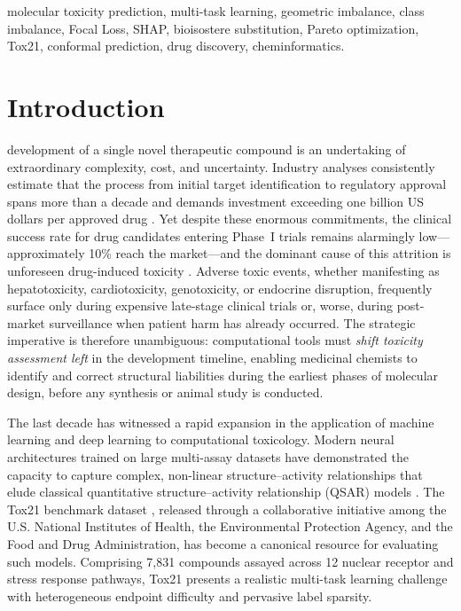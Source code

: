 \documentclass[lettersize,journal]{IEEEtran}
\begin{document}
\begin{IEEEkeywords}
molecular toxicity prediction, multi-task learning, geometric imbalance,
class imbalance, Focal Loss, SHAP, bioisostere substitution, Pareto
optimization, Tox21, conformal prediction, drug discovery, cheminformatics.
\end{IEEEkeywords}

\section{Introduction}
 development of a single novel therapeutic compound is an
undertaking of extraordinary complexity, cost, and uncertainty.
Industry analyses consistently estimate that the process from initial target
identification to regulatory approval spans more than a decade and demands
investment exceeding one billion US dollars per approved drug \cite{kola2004}.
Yet despite these enormous commitments, the clinical success rate for drug
candidates entering Phase~I trials remains alarmingly low---approximately 10\%
reach the market---and the dominant cause of this attrition is unforeseen
drug-induced toxicity \cite{sun2022}.
Adverse toxic events, whether manifesting as hepatotoxicity, cardiotoxicity,
genotoxicity, or endocrine disruption, frequently surface only during expensive
late-stage clinical trials or, worse, during post-market surveillance when
patient harm has already occurred.
The strategic imperative is therefore unambiguous: computational tools must
\textit{shift toxicity assessment left} in the development timeline, enabling
medicinal chemists to identify and correct structural liabilities during the
earliest phases of molecular design, before any synthesis or animal study is
conducted.

The last decade has witnessed a rapid expansion in the application of machine
learning and deep learning to computational toxicology.
Modern neural architectures trained on large multi-assay datasets have
demonstrated the capacity to capture complex, non-linear structure--activity
relationships that elude classical quantitative structure--activity relationship
(QSAR) models \cite{zhang2025}.
The Tox21 benchmark dataset \cite{tox21}, released through a collaborative
initiative among the U.S. National Institutes of Health, the Environmental
Protection Agency, and the Food and Drug Administration, has become a canonical
resource for evaluating such models.
Comprising 7,831 compounds assayed across 12 nuclear receptor and stress
response pathways, Tox21 presents a realistic multi-task learning challenge
with heterogeneous endpoint difficulty and pervasive label sparsity.
\end{document}
